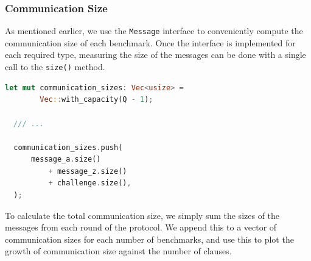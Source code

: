 \subsubsection{Communication Size} 
As mentioned earlier, we use the \texttt{Message} interface to conveniently 
compute the communication size of each benchmark. Once the interface is 
implemented for each required type, measuring the size of the messages 
can be done with a single call to the \texttt{size()} method. 

\begin{lstlisting}[language=rust]
  let mut communication_sizes: Vec<usize> =
        Vec::with_capacity(Q - 1);

  /// ...

  communication_sizes.push(
      message_a.size()
          + message_z.size()
          + challenge.size(),
  );
\end{lstlisting}

To calculate the total communication size, we simply sum the sizes of the 
messages from each round of the protocol. We append this to a vector of 
communication sizes for each number of benchmarks, and use this to 
plot the growth of communication size against the number of clauses. 